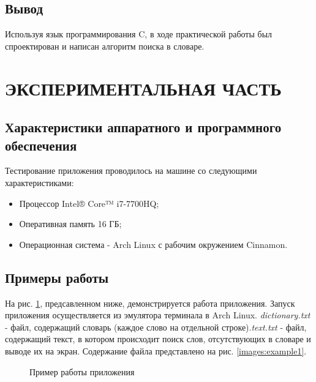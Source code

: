 \documentclass[a4paper,12pt]{article}
\begin{document}
\newpage
\subsection{Вывод}
Используя язык программирования C, в ходе практической работы был спроектирован и написан алгоритм поиска в словаре.

\newpage
\section{ЭКСПЕРИМЕНТАЛЬНАЯ ЧАСТЬ}
\subsection{Характеристики аппаратного и программного обеспечения}
Тестирование приложения проводилось на машине со следующими характеристиками:\\
\begin{itemize}
\item Процессор Intel® Core™ i7-7700HQ;
\item Оперативная память 16 ГБ;
\item Операционная система - Arch Linux с рабочим окружением Cinnamon.
\end{itemize}

\newpage
\subsection{Примеры работы}
На рис. \ref{images:example}, предсавленном ниже, демонстрируется работа приложения. Запуск приложения осуществляется из эмулятора терминала в Arch Linux.
\textit{dictionary.txt} - файл, содержащий словарь (каждое слово на отдельной строке).\textit{text.txt} - файл, содержащий текст, в котором происходит поиск слов, отсутствующих в словаре и выводе их на экран. Содержание файла представлено на рис. \ref{images:example1}.

\begin{figure}[h]
\caption{Пример работы приложения}
\label{images:example}
\end{figure}
\end{document}
